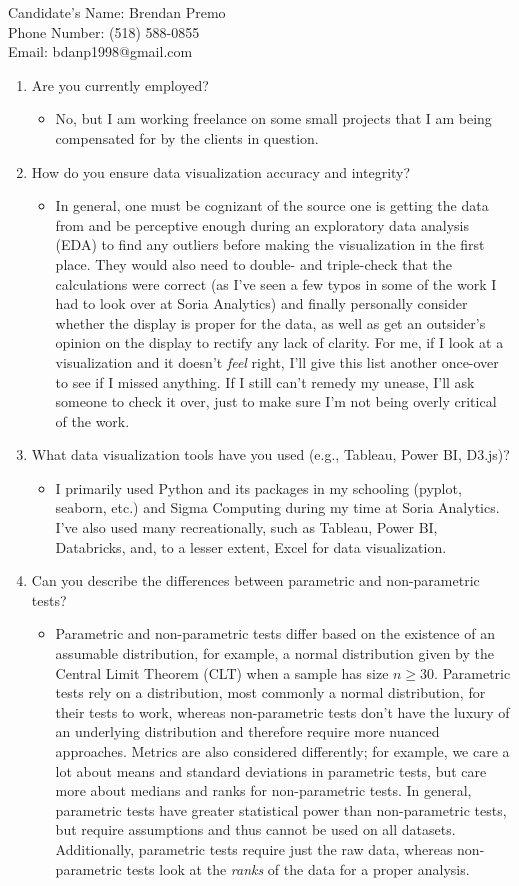 \documentclass[11pt]{article}
\newcommand{\answer}[1]{%
  \par\vspace{0.35em}%
  \begin{itemize}[label={},leftmargin=1.5em,topsep=0pt,partopsep=0pt,parsep=0pt,itemsep=0pt]
    \item #1
  \end{itemize}%
  \vspace{0.35em}%
}
\begin{document}
\noindent
Candidate's Name: Brendan Premo\\
Phone Number: (518) 588-0855\\
Email: bdanp1998@gmail.com

\vspace{1em}

\begin{enumerate}[leftmargin=*]
    \item Are you currently employed?
    \answer{No, but I am working freelance on some small projects that I am being compensated for by the clients in question.}

    \item How do you ensure data visualization accuracy and integrity?
    \answer{In general, one must be cognizant of the source one is getting the data from and be perceptive enough during an 
    exploratory data analysis (EDA) to find any outliers before making the visualization in the first place. They would 
    also need to double- and triple-check that the calculations were correct (as I've seen a few typos in some of the work
    I had to look over at Soria Analytics) and finally personally consider whether the display is proper for the data, as well
    as get an outsider's opinion on the display to rectify any lack of clarity. For me, if I look at a visualization and
    it doesn't \textit{feel} right, I'll give this list another once-over to see if I missed anything. If I still can't 
    remedy my unease, I'll ask someone to check it over, just to make sure I'm not being overly critical of the work.}

    \item What data visualization tools have you used (e.g., Tableau, Power BI, D3.js)?
    \answer{I primarily used Python and its packages in my schooling (pyplot, seaborn, etc.) and Sigma Computing during my time at 
    Soria Analytics. I've also used many recreationally, such as Tableau, Power BI, Databricks, and, to a lesser extent, Excel for 
    data visualization.}

    \item Can you describe the differences between parametric and non-parametric tests?
    \answer{Parametric and non-parametric tests differ based on the existence of an assumable distribution, for example, a
    normal distribution given by the Central Limit Theorem (CLT) when a sample has size $n\geq30$. Parametric tests rely on a 
    distribution, most commonly a normal distribution, for their tests to work, whereas non-parametric tests don't have the 
    luxury of an underlying distribution and therefore require more nuanced approaches. Metrics are also considered differently; 
    for example, we care a lot about means and standard deviations in parametric tests, but care more about medians and 
    ranks for non-parametric tests. In general, parametric tests have greater statistical power than non-parametric tests, but require 
    assumptions and thus cannot be used on all datasets. Additionally, parametric tests require just the raw data, whereas
    non-parametric tests look at the \textit{ranks} of the data for a proper analysis.}


\end{enumerate}
\end{document}
